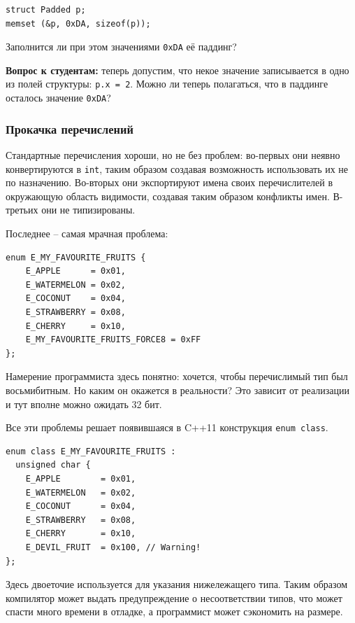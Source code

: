 \documentclass[a4paper,12pt,oneside]{article}
\newif\ifanswers
\begin{document}
\begin{lstlisting}
struct Padded p;
memset (&p, 0xDA, sizeof(p));
\end{lstlisting}

Заполнится ли при этом значениями \lstinline!0xDA! её паддинг?

\ifanswers
Верный ответ: да, несомненно.
\fi

\textbf{Вопрос к студентам:} теперь допустим, что некое значение записывается в одно из полей структуры: \lstinline!p.x = 2!. Можно ли теперь полагаться, что в паддинге осталось значение \lstinline!0xDA!?

\ifanswers
Верный ответ: нет, потому что см. выше, при записи в поля, паддинг unspecified.
\fi

\subsubsection{Прокачка перечислений}\label{EnumClass}

Стандартные перечисления хороши, но не без проблем: во-первых они неявно конвертируются в \lstinline!int!, таким образом создавая возможность использовать их не по назначению. Во-вторых они экспортируют имена своих перечислителей в окружающую область видимости, создавая таким образом конфликты имен. В-третьих они не типизированы.

Последнее -- самая мрачная проблема:

\begin{lstlisting}
enum E_MY_FAVOURITE_FRUITS {
    E_APPLE      = 0x01,
    E_WATERMELON = 0x02,
    E_COCONUT    = 0x04,
    E_STRAWBERRY = 0x08,
    E_CHERRY     = 0x10,
    E_MY_FAVOURITE_FRUITS_FORCE8 = 0xFF
};
\end{lstlisting}

Намерение программиста здесь понятно: хочется, чтобы перечислимый тип был восьмибитным. Но каким он окажется в реальности? Это зависит от реализации и тут вполне можно ожидать 32 бит.

Все эти проблемы решает появившаяся в C++11 конструкция \lstinline!enum class!.

\begin{lstlisting}
enum class E_MY_FAVOURITE_FRUITS : 
  unsigned char {
    E_APPLE        = 0x01,
    E_WATERMELON   = 0x02,
    E_COCONUT      = 0x04,
    E_STRAWBERRY   = 0x08,
    E_CHERRY       = 0x10,
    E_DEVIL_FRUIT  = 0x100, // Warning!
};
\end{lstlisting}

Здесь двоеточие используется для указания нижележащего типа. Таким образом компилятор может выдать предупреждение о несоответствии типов, что может спасти много времени в отладке, а программист может сэкономить на размере. 
\end{document}
